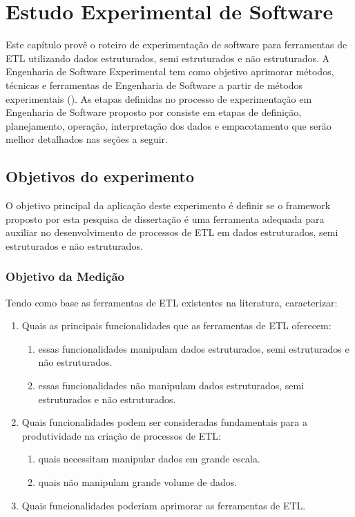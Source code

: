 \chapter{Estudo Experimental de Software}

Este capítulo provê o roteiro de experimentação de software para ferramentas de ETL utilizando dados estruturados, semi estruturados e não estruturados. A Engenharia de Software Experimental tem como objetivo aprimorar métodos, técnicas e ferramentas de Engenharia de Software a partir de métodos experimentais (\cite{souza:2015}). As etapas definidas no processo de experimentação em Engenharia de Software proposto por \cite{souza:2015} consiste em etapas de definição, planejamento, operação, interpretação dos dados e empacotamento que serão melhor detalhados nas seções a seguir.
\clearpage

\section{Objetivos do experimento}

O objetivo principal da aplicação deste experimento é definir se o framework proposto por esta pesquisa de dissertação é uma ferramenta adequada para auxiliar no desenvolvimento de processos de ETL em dados estruturados, semi estruturados e não estruturados.

\subsection{Objetivo da Medição}

Tendo como base as ferramentas de ETL existentes na literatura, caracterizar:

\begin{enumerate}
	\item Quais as principais funcionalidades que as ferramentas de ETL oferecem:
	\begin{enumerate}
		\item essas funcionalidades manipulam dados estruturados, semi estruturados e não estruturados.
		\item  essas funcionalidades não manipulam dados estruturados, semi estruturados e não estruturados.
	\end{enumerate}
	\item Quais funcionalidades podem ser consideradas fundamentais para a produtividade na criação de processos de ETL:
	\begin{enumerate}
		\item quais necessitam manipular dados em grande escala.
		\item quais não manipulam grande volume de dados.
	\end{enumerate}
	\item Quais funcionalidades poderiam aprimorar as ferramentas de ETL.
\end{enumerate}

